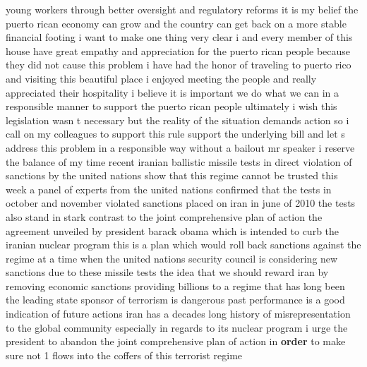 \documentclass{article}
\begin{document}
young workers through better oversight and regulatory reforms it is my belief the puerto rican economy can grow and the country can get back on a more stable financial footing i want to make one thing very clear i and every member of this house have great empathy and appreciation for the puerto rican people because they did not cause this problem i have had the honor of traveling to puerto rico and visiting this beautiful place i enjoyed meeting the people and really appreciated their hospitality i believe it is important we do what we can in a responsible manner to support the puerto rican people ultimately i wish this legislation wasn t necessary but the reality of the situation demands action so i call on my colleagues to support this rule support the underlying bill and let s address this problem in a responsible way without a bailout mr speaker i reserve the balance of my time
\vspace{8mm}
recent iranian ballistic missile tests in direct violation of sanctions by the united nations show that this regime cannot be trusted this week a panel of experts from the united nations confirmed that the tests in october and november violated sanctions placed on iran in june of 2010 the tests also stand in stark contrast to the joint comprehensive plan of action the agreement unveiled by president barack obama which is intended to curb the iranian nuclear program this is a plan which would roll back sanctions against the regime at a time when the united nations security council is considering new sanctions due to these missile tests the idea that we should reward iran by removing economic sanctions providing billions to a regime that has long been the leading state sponsor of terrorism is dangerous past performance is a good indication of future actions iran has a decades long history of misrepresentation to the global community especially in regards to its nuclear program i urge the president to abandon the joint comprehensive plan of action in {\bf \color{red} order} to make sure not 1 flows into the coffers of this terrorist regime\pagebreak
\end{document}
